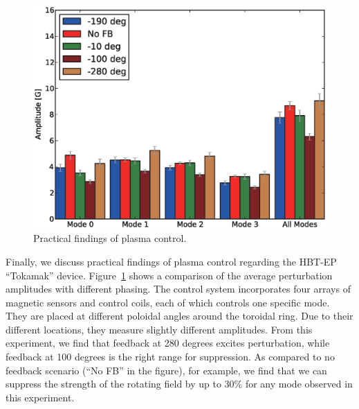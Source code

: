 \begin{figure}[t]
 \centering
 \includegraphics[width=\hsize]{eps/overview.eps}
 \caption{Practical findings of plasma control.}
 \label{fig:plasma_overview}
\end{figure}

Finally, we discuss practical findings of plasma control regarding the
HBT-EP ``Tokamak'' device.
Figure~\ref{fig:plasma_overview} shows a comparison of the average
perturbation amplitudes with different phasing.
The control system incorporates four arrays of magnetic sensors and
control coils, each of which controls one specific mode.
They are placed at different poloidal angles around the toroidal ring.
Due to their different locations, they measure slightly different
amplitudes.
From this experiment, we find that feedback at 280 degrees excites
perturbation, while feedback at 100 degrees is the right range for
suppression.
As compared to no feedback scenario (``No FB'' in the figure), for
example, we find that we can suppress the strength of the rotating field
by up to 30\% for any mode observed in this experiment.
